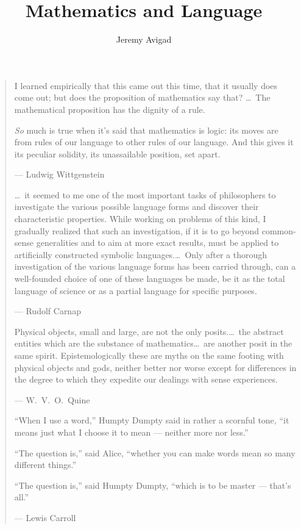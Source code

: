 \documentclass[11pt]{article}
\title{Mathematics and Language}
\author{Jeremy Avigad}
\begin{document}
\maketitle

\begin{quote}

I learned empirically that this came out this time, that it usually does come out; but does the proposition of mathematics say that? \ldots\ The mathematical proposition has the dignity of a rule.

\emph{So} much is true when it's said that mathematics is logic: its moves are from rules of our language to other rules of our language. And this gives it its peculiar solidity, its unassailable position, set apart.

--- Ludwig Wittgenstein

\bigskip

\ldots\ it seemed to me one of the most important tasks of philosophers to investigate the various possible language forms and discover their characteristic properties. While working on problems of this kind, I gradually realized that such an investigation, if it is to go beyond common-sense generalities and to aim at more exact results, must be applied to artificially constructed symbolic languages.\ldots\ Only after a thorough investigation of the various language forms has been carried through, can a well-founded choice of one of these languages be made, be it as the total language of science or as a partial language for specific purposes.

--- Rudolf Carnap

\bigskip

Physical objects, small and large, are not the only posits.\ldots\ the abstract entities which are the substance of mathematics\ldots\ are another posit in the same spirit. Epistemologically these are myths on the same footing with physical objects and gods, neither better nor worse except for differences in the degree to which they expedite our dealings with sense experiences.

--- W.~V.~O.~Quine

\bigskip

``When I use a word,'' Humpty Dumpty said in rather a scornful tone, ``it means just what I choose it to mean --- neither more nor less.''

``The question is,'' said Alice, ``whether you can make words mean so many different things.''

``The question is,'' said Humpty Dumpty, ``which is to be master --- that's all.''

--- Lewis Carroll

\end{quote}
\end{document}
